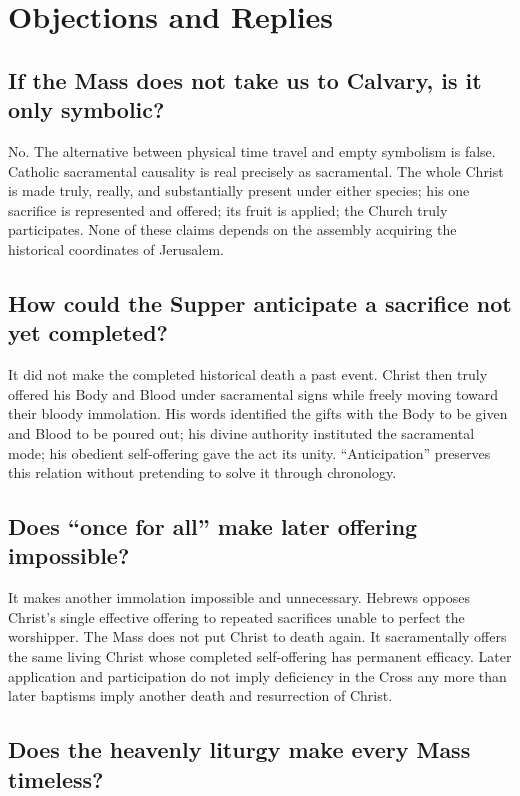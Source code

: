\section{Objections and Replies}

\subsection*{If the Mass does not take us to Calvary, is it only symbolic?}

No. The alternative between physical time travel and empty symbolism is false.
Catholic sacramental causality is real precisely as sacramental. The whole
Christ is made truly, really, and substantially present under either species;
his one sacrifice is represented and offered; its fruit is applied; the Church
truly participates. None of these claims depends on the assembly acquiring the
historical coordinates of Jerusalem.

\subsection*{How could the Supper anticipate a sacrifice not yet completed?}

It did not make the completed historical death a past event. Christ then
truly offered his Body and Blood under sacramental signs while freely moving
toward their bloody immolation. His words identified the gifts with the Body
to be given and Blood to be poured out; his divine authority instituted the
sacramental mode; his obedient self-offering gave the act its unity.
``Anticipation'' preserves this relation without pretending to solve it
through chronology.

\subsection*{Does ``once for all'' make later offering impossible?}

It makes another immolation impossible and unnecessary. Hebrews opposes
Christ's single effective offering to repeated sacrifices unable to perfect
the worshipper. The Mass does not put Christ to death again. It sacramentally
offers the same living Christ whose completed self-offering has permanent
efficacy. Later application and participation do not imply deficiency in the
Cross any more than later baptisms imply another death and resurrection of
Christ.

\subsection*{Does the heavenly liturgy make every Mass timeless?}

